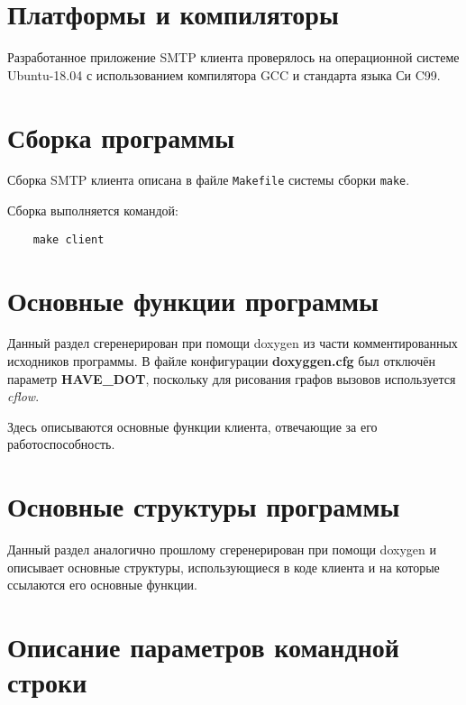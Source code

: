 \documentclass[a4paper,12pt]{report}
\begin{document}
\section{Платформы и компиляторы}

Разработанное приложение SMTP клиента проверялось на операционной системе Ubuntu-18.04 с использованием компилятора GCC и стандарта языка Си C99.


\section{Сборка программы}

Сборка SMTP клиента описана в файле \texttt{Makefile} системы сборки \texttt{make}.

Сборка выполняется командой:
\begin{verbatim}
    make client
\end{verbatim}


\section{Основные функции программы}

Данный раздел сгеренерирован при помощи doxygen из части комментированных исходников программы. В файле конфигурации \textbf{doxyggen.cfg} был отключён параметр \textbf{HAVE\_DOT}, поскольку для рисования графов вызовов используется \textit{cflow}.

Здесь описываются основные функции клиента, отвечающие за его работоспособность.







\section{Основные структуры программы}

Данный раздел аналогично прошлому сгеренерирован при помощи doxygen и описывает основные структуры, использующиеся в коде клиента и на которые ссылаются его основные функции.






\section{Описание параметров командной строки}
\end{document}

